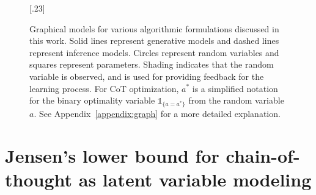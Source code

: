 \documentclass{article}
\theoremstyle{definition}
\begin{document}
\begin{figure}[!t]
{
}
[.23\linewidth]{
}
\caption{\small{Graphical models for various algorithmic formulations discussed in this work. Solid lines represent generative models and dashed lines represent inference models. Circles represent random variables and squares represent parameters. Shading indicates that the random variable is observed, and is used for providing feedback for the learning process. For CoT optimization, $a^*$ is a simplified notation for the binary optimality variable $\mathds{1}_{\{a=a^\ast\}}$ from the random variable $a$. See Appendix~\ref{appendix:graph} for a more detailed explanation.}}
\label{figure:cotgraph}
\end{figure}

\section{Jensen's lower bound for chain-of-thought as latent variable modeling}\label{sec:algo}
\end{document}
